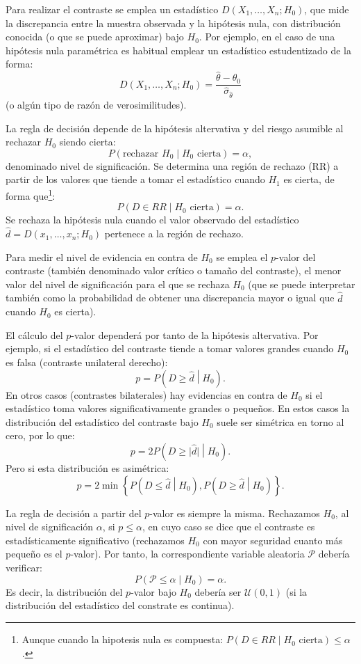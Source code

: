 \documentclass[]{book}
\theoremstyle{break}
\theoremstyle{definition}
\theoremstyle{definition}
\theoremstyle{definition}
\theoremstyle{remark}
\begin{document}
Para realizar el contraste se emplea un estadístico
\(D\left( X_1,\ldots ,X_n;H_0\right)\), que mide la discrepancia entre
la muestra observada y la hipótesis nula, con distribución conocida (o
que se puede aproximar) bajo \(H_0\). Por ejemplo, en el caso de una
hipótesis nula paramétrica es habitual emplear un estadístico
estudentizado de la forma: \[D\left( X_1,\ldots ,X_n;H_0\right) =
\frac{\hat{\theta}-\theta _0}{\hat\sigma_{\hat\theta}}\] (o algún tipo
de razón de verosimilitudes).

La regla de decisión depende de la hipótesis altervativa y del riesgo
asumible al rechazar \(H_0\) siendo cierta:
\[P\left( \text{rechazar }H_0\mid H_0\text{ cierta}\right) =\alpha,\]
denominado nivel de significación. Se determina una región de rechazo
(RR) a partir de los valores que tiende a tomar el estadístico cuando
\(H_1\) es cierta, de forma que\footnote{Aunque cuando la hipotesis nula
  es compuesta:
  \(P\left( D\in RR \mid H_0\text{ cierta}\right) \leq \alpha\).}:
\[P\left( D\in RR \mid H_0\text{ cierta}\right) =\alpha.\] Se rechaza la
hipótesis nula cuando el valor observado del estadístico
\(\hat{d}=D\left( x_1,\ldots ,x_n;H_0\right)\) pertenece a la región de
rechazo.

Para medir el nivel de evidencia en contra de \(H_0\) se emplea el
\(p\)-valor del contraste (también denominado valor crítico o tamaño del
contraste), el menor valor del nivel de significación para el que se
rechaza \(H_0\) (que se puede interpretar también como la probabilidad
de obtener una discrepancia mayor o igual que \(\hat{d}\) cuando \(H_0\)
es cierta).

El cálculo del \(p\)-valor dependerá por tanto de la hipótesis
altervativa. Por ejemplo, si el estadístico del contraste tiende a tomar
valores grandes cuando \(H_0\) es falsa (contraste unilateral derecho):
\[p = P\left( D \geq \hat{d} \middle| H_0\right).\] En otros casos
(contrastes bilaterales) hay evidencias en contra de \(H_0\) si el
estadístico toma valores significativamente grandes o pequeños. En estos
casos la distribución del estadístico del contraste bajo \(H_0\) suele
ser simétrica en torno al cero, por lo que:
\[p = 2P\left( D \geq \vert \hat{d} \vert \middle| H_0 \right).\] Pero
si esta distribución es asimétrica:
\[p = 2 \min \left\{ P\left( D \leq \hat{d} \middle| H_0 \right),
P\left( D \geq \hat{d} \middle| H_0\right) \right\}.\]

La regla de decisión a partir del \(p\)-valor es siempre la misma.
Rechazamos \(H_0\), al nivel de significación \(\alpha\), si
\(p \leq \alpha\), en cuyo caso se dice que el contraste es
estadísticamente significativo (rechazamos \(H_0\) con mayor seguridad
cuanto más pequeño es el \(p\)-valor). Por tanto, la correspondiente
variable aleatoria \(\mathcal{P}\) debería verificar:
\[P\left( \mathcal{P} \leq \alpha \middle| H_0\right)= \alpha.\] Es
decir, la distribución del \(p\)-valor bajo \(H_0\) debería ser
\(\mathcal{U}(0,1)\) (si la distribución del estadístico del constrate
es continua).
\end{document}
